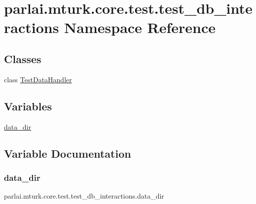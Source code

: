 \hypertarget{namespaceparlai_1_1mturk_1_1core_1_1test_1_1test__db__interactions}{}\section{parlai.\+mturk.\+core.\+test.\+test\+\_\+db\+\_\+interactions Namespace Reference}
\label{namespaceparlai_1_1mturk_1_1core_1_1test_1_1test__db__interactions}
\subsection*{Classes}
\begin{DoxyCompactItemize}
\item 
class \hyperlink{classparlai_1_1mturk_1_1core_1_1test_1_1test__db__interactions_1_1TestDataHandler}{Test\+Data\+Handler}
\end{DoxyCompactItemize}
\subsection*{Variables}
\begin{DoxyCompactItemize}
\item 
\hyperlink{namespaceparlai_1_1mturk_1_1core_1_1test_1_1test__db__interactions_a033da2ef81c936c9d2864de258bacca9}{data\+\_\+dir}
\end{DoxyCompactItemize}


\subsection{Variable Documentation}
\mbox{\label{namespaceparlai_1_1mturk_1_1core_1_1test_1_1test__db__interactions_a033da2ef81c936c9d2864de258bacca9}} 
\subsubsection{\texorpdfstring{data\+\_\+dir}{data\_dir}}
{\footnotesize\ttfamily parlai.\+mturk.\+core.\+test.\+test\+\_\+db\+\_\+interactions.\+data\+\_\+dir}

